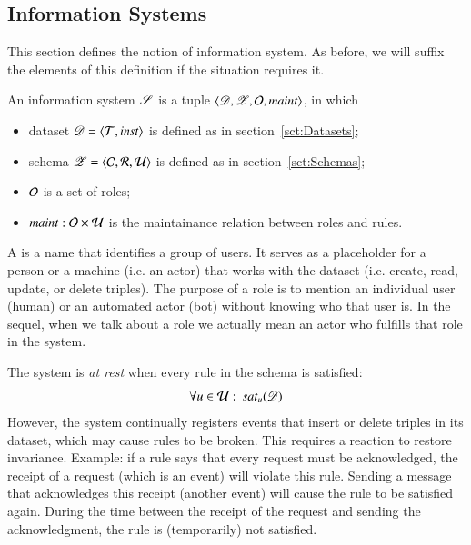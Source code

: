 \documentclass{elsarticle}
\begin{document}
\subsection{Information Systems}
\label{sct:Information Systems}
   This section defines the notion of information system.
   As before, we will suffix the elements of this definition if the situation requires it.
\begin{definition}
\label{def:information system}
\item An information system $\mathscr{S}$ is a tuple $\langle\mathscr{D},\mathscr{Z},\mathcal{O},\text{\it maint\/}\rangle$, in which
\begin{itemize}
   \item dataset $\mathscr{D}=\langle{\mathcal{T}},{\text{\it inst\/}}\rangle$ is defined as in section~\ref{sct:Datasets};
   \item schema $\mathscr{Z}=\langle{\mathcal{C}},{\mathcal{R}},{\mathcal{U}}\rangle$ is defined as in section~\ref{sct:Schemas};
   \item $\mathcal{O}$ is a set of roles;
   \item $\text{\it maint\/} : \mathcal{O}\times\mathcal{U}$ is the maintainance relation between roles and rules.
\end{itemize}
\end{definition}
   A  is a name that identifies a group of users.
   It serves as a placeholder for a person or a machine (i.e. an actor) that works with the dataset (i.e. create, read, update, or delete triples).
   The purpose of a role is to mention an individual user (human) or an automated actor (bot) without knowing who that user is.
   In the sequel, when we talk about a role we actually mean an actor who fulfills that role in the system.

   The system is {\em at rest} when every rule in the schema is satisfied:
\begin{equation}
   \forall u\in\rules:\ \sat{u}{\dataset}\label{eqn:satisfaction}
\end{equation}
   However, the system continually registers events that insert or delete triples in its dataset,
   which may cause rules to be broken.
   This requires a reaction to restore invariance.
   Example: if a rule says that every request must be acknowledged, the receipt of a request (which is an event) will violate this rule.
   Sending a message that acknowledges this receipt (another event) will cause the rule to be satisfied again.
   During the time between the receipt of the request and sending the acknowledgment, the rule is (temporarily) not satisfied.
\end{document}
